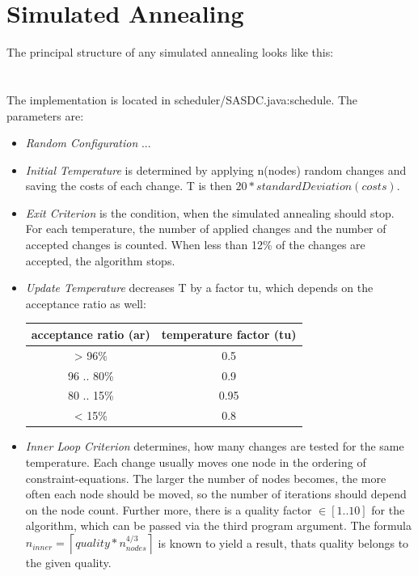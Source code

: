 \documentclass[colorback,accentcolor=tud1c,11pt]{tudreport}
\begin{document}
  \chapter{Simulated Annealing}
  The principal structure of any simulated annealing looks like this:\\
  \\ \\
  The implementation is located in scheduler/SASDC.java:schedule. The parameters are:
  \begin{itemize}
  	\item \emph{Random Configuration} ...
  	\item \emph{Initial Temperature} is determined by applying n(nodes) random changes and saving the costs of each change. T is then $20 * standardDeviation(costs)$.
  	\item \emph{Exit Criterion} is the condition, when the simulated annealing should stop. For each temperature, the number of applied changes and the number of accepted changes is counted. When less than 12\% of the changes are accepted, the algorithm stops.
  	\item \emph{Update Temperature} decreases T by a factor tu, which depends on the acceptance ratio as well:
  	\begin{tabular}{ c | c }
  		acceptance ratio (ar) & temperature factor (tu) \\
  		\hline
  		> 96\% & 0.5 \\
  		96 .. 80\% & 0.9 \\
  		80 .. 15\% & 0.95 \\
  		< 15\% & 0.8 \\
  	\end{tabular}
    \item \emph{Inner Loop Criterion} determines, how many changes are tested for the same temperature. Each change usually moves one node in the ordering of constraint-equations. The larger the number of nodes becomes, the more often each node should be moved, so the number of iterations should depend on the node count. Further more, there is a quality factor $\in [1 .. 10]$ for the algorithm, which can be passed via the third program argument. The formula $n_{inner} = \left\lceil quality * n_{nodes}^{4/3} \right\rceil$ is known to yield a result, thats quality belongs to the given quality.
  \end{itemize}
\end{document}
